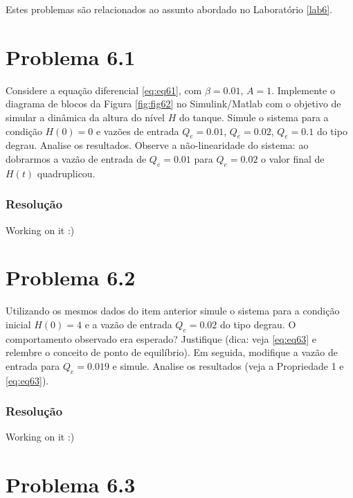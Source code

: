 \documentclass[
]{book}
\theoremstyle{definition}
\theoremstyle{definition}
\theoremstyle{definition}
\theoremstyle{remark}
\begin{document}
Estes problemas são relacionados ao assunto abordado no Laboratório \ref{lab6}.

\hypertarget{problema-6.1}{%
\section*{Problema 6.1}\label{problema-6.1}}

Considere a equação diferencial \eqref{eq:eq61}, com \(\beta = 0.01\), \(A = 1\). Implemente o diagrama de blocos da Figura \ref{fig:fig62} no Simulink/Matlab com o objetivo de simular a dinâmica da altura do nível \(H\) do tanque. Simule o sistema para a condição \(H(0) = 0\) e vazões de entrada \(Q_e = 0.01\), \(Q_e = 0.02\), \(Q_e = 0.1\) do tipo degrau. Analise os resultados. Observe a não-linearidade do sistema: ao dobrarmos a vazão de entrada de \(Q_e = 0.01\) para \(Q_e = 0.02\) o valor final de \(H(t)\) quadruplicou.

\hypertarget{resoluuxe7uxe3o-16}{%
\subsubsection*{Resolução}\label{resoluuxe7uxe3o-16}}

Working on it :)

\hypertarget{problema-6.2}{%
\section*{Problema 6.2}\label{problema-6.2}}

Utilizando os mesmos dados do item anterior simule o sistema para a condição inicial \(H(0)=4\) e a vazão de entrada \(Q_e = 0.02\) do tipo degrau. O comportamento observado era esperado? Justifique (dica: veja \eqref{eq:eq63} e relembre o conceito de ponto de equilíbrio). Em seguida, modifique a vazão de entrada para \(Q_e = 0.019\) e simule. Analise os resultados (veja a Propriedade 1 e \eqref{eq:eq63}).

\hypertarget{resoluuxe7uxe3o-17}{%
\subsubsection*{Resolução}\label{resoluuxe7uxe3o-17}}

Working on it :)

\hypertarget{problema-6.3}{%
\section*{Problema 6.3}\label{problema-6.3}}
\end{document}
